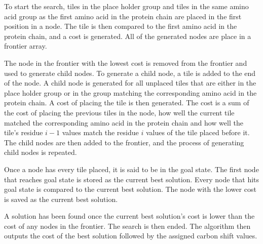 \documentclass[12pt]{article}
\begin{document}
To start the search, tiles in the place holder group and tiles in the same amino acid group as the first amino acid in the protein chain are placed in the first position in a node. The tile is then compared to the first amino acid in the protein chain, and a cost is generated. All of the generated nodes are place in a frontier array. 

The node in the frontier with the lowest cost is removed from the frontier and used to generate child nodes. To generate a child node, a tile is added to the end of the node. A child node is generated for all unplaced tiles that are either in the place holder group or in the group matching the corresponding amino acid in the protein chain. A cost of placing the tile is then generated. The cost is a sum of the cost of placing the previous tiles in the node, how well the current tile matched the corresponding amino acid in the protein chain and how well the tile's residue $i-1$ values match the residue $i$ values of the tile placed before it. The child nodes are then added to the frontier, and the process of generating child nodes is repeated. 

Once a node has every tile placed, it is said to be in the goal state. The first node that reaches goal state is stored as the current best solution. Every node that hits goal state is compared to the current best solution. The node with the lower cost is saved as the current best solution.

A solution has been found once the current best solution's cost is lower than the cost of any nodes in the frontier. The search is then ended. The algorithm then outputs the cost of the best solution followed by the assigned carbon shift values. 



\end{document}
